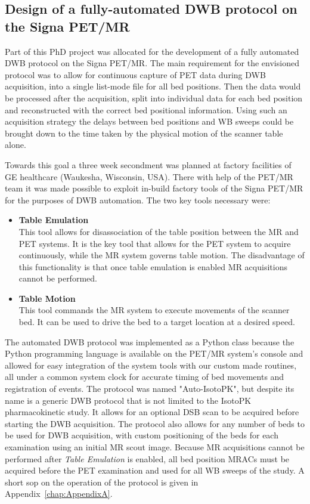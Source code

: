 \subsection{Design of a fully-automated DWB protocol on the Signa PET/MR}
Part of this PhD project was allocated for the development of a fully automated DWB protocol on the Signa PET/MR. 
The main requirement for the envisioned protocol was to allow for continuous capture of PET data during DWB acquisition, into a single list-mode file for all bed positions. Then the data would be processed after the acquisition, split into individual data for each bed position and reconstructed with the correct bed positional information. Using such an acquisition strategy the delays between bed positions and WB sweeps could be brought down to the time taken by the physical motion of the scanner table alone. 

Towards this goal a three week secondment was planned at factory facilities of GE healthcare (Waukesha, Wisconsin, USA). %
There with help of the PET/MR team it was made possible to exploit in-build factory tools of the Signa PET/MR for the purposes of DWB automation. The two key tools necessary were: 
\begin{itemize}
    \item\textbf{Table Emulation} \\
    This tool allows for disassociation of the table position between the MR and PET systems. It is the key tool that allows for the PET system to acquire continuously, while the MR system governs table motion. The disadvantage of this functionality is that once table emulation is enabled MR acquisitions cannot be performed.%
    \item\textbf{Table Motion} \\
    This tool commands the MR system to execute movements of the scanner bed. It can be used to drive the bed to a target location at a desired speed. 
\end{itemize}

The automated DWB protocol was implemented as a Python class because the Python programming language is available on the PET/MR system's console and allowed for easy integration of the system tools with our custom made routines, all under a common system clock for accurate timing of bed movements and registration of events.
The protocol was named "Auto-IsotoPK", but despite its name is a generic DWB protocol that is not limited to the IsotoPK pharmacokinetic study. It allows for an optional DSB scan to be acquired before starting the DWB acquisition. The protocol also allows for any number of beds to be used for DWB acquisition, with custom positioning of the beds for each examination using an initial MR scout image. 
Because MR acquisitions cannot be performed after \textit{Table Emulation} is enabled, all bed position MRACs must be acquired before the PET examination and used for all WB sweeps of the study.
A short \gls{sop} on the operation of the protocol is given in Appendix~\ref{chap:AppendixA}.

